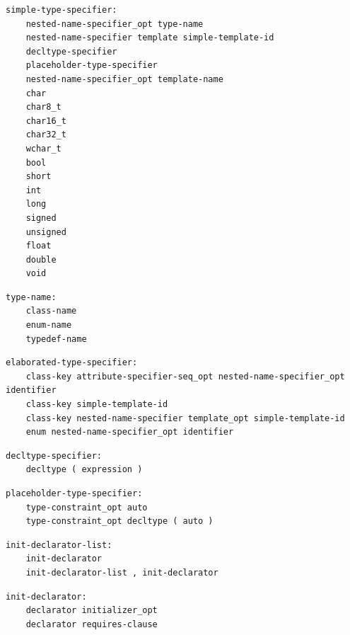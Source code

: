 \noindent\textbf{\texttt{}}\par
\begin{lstlisting}
simple-type-specifier:
    nested-name-specifier_opt type-name
    nested-name-specifier template simple-template-id
    decltype-specifier
    placeholder-type-specifier
    nested-name-specifier_opt template-name
    char
    char8_t
    char16_t
    char32_t
    wchar_t
    bool
    short
    int
    long
    signed
    unsigned
    float
    double
    void
\end{lstlisting}

\noindent\textbf{\texttt{}}\par
\begin{lstlisting}
type-name:
    class-name
    enum-name
    typedef-name
\end{lstlisting}

\noindent\textbf{\texttt{}}\par
\begin{lstlisting}
elaborated-type-specifier:
    class-key attribute-specifier-seq_opt nested-name-specifier_opt identifier
    class-key simple-template-id
    class-key nested-name-specifier template_opt simple-template-id
    enum nested-name-specifier_opt identifier
\end{lstlisting}

\noindent\textbf{\texttt{}}\par
\begin{lstlisting}
decltype-specifier:
    decltype ( expression )
\end{lstlisting}

\noindent\textbf{\texttt{}}\par
\begin{lstlisting}
placeholder-type-specifier:
    type-constraint_opt auto
    type-constraint_opt decltype ( auto )
\end{lstlisting}

\noindent\textbf{\texttt{}}\par
\begin{lstlisting}
init-declarator-list:
    init-declarator
    init-declarator-list , init-declarator
\end{lstlisting}

\noindent\textbf{\texttt{}}\par
\begin{lstlisting}
init-declarator:
    declarator initializer_opt
    declarator requires-clause
\end{lstlisting}

